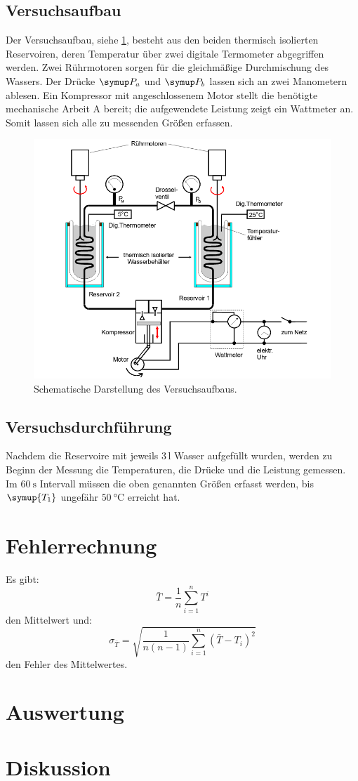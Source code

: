 \subsection{Versuchsaufbau}
Der Versuchsaufbau, siehe \ref{fig:1}, besteht aus den beiden thermisch isolierten Reservoiren, deren Temperatur über zwei
digitale Termometer abgegriffen werden. Zwei Rührmotoren sorgen für die gleichmäßige Durchmischung des Wassers.
Der Drücke $\symup P_a$ und $\symup P_b$ lassen sich an zwei Manometern ablesen. Ein Kompressor
mit angeschlossenem Motor stellt die benötigte mechanische Arbeit A bereit; die aufgewendete Leistung zeigt
ein Wattmeter an. Somit lassen sich alle zu messenden Größen erfassen.
\begin{figure}
  \centering
  \includegraphics[scale=0.5]{schema.png}
  \caption{Schematische Darstellung des Versuchsaufbaus.}
  \label{fig:1}
\end{figure}
\subsection{Versuchsdurchführung}
Nachdem die Reservoire mit jeweils 3\,$\si{\litre}$ Wasser aufgefüllt wurden,
werden zu Beginn der Messung  die Temperaturen, die Drücke und die Leistung gemessen.
Im $\SI{60}{\second}$ Intervall müssen die oben genannten Größen erfasst werden, bis
$\symup{T_1}$ ungefähr $\SI{50}{\celsius}$ erreicht hat.
\section{Fehlerrechnung}
Es gibt:
\begin{equation}
  \bar{T} = \frac{1}{n} \sum_{i=1}^{n} T^{i}
  \label{eqn:1}
\end{equation}
den Mittelwert und:
\begin{equation}
  \sigma_{\bar{T}} = \sqrt{\frac{1}{n(n-1)} \sum_{i=1}^{n}(\bar{T}-T_i)^2}
  \label{eqn:2}
\end{equation}
den Fehler des Mittelwertes.
\section{Auswertung}
\section{Diskussion}
\newpage
\nocite{*}
\printbibliography
